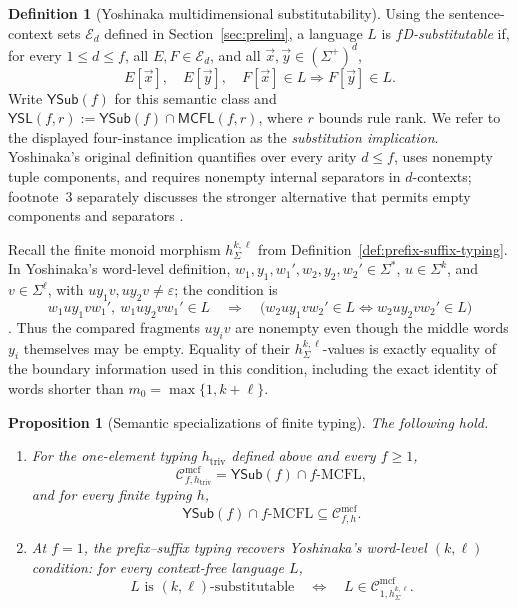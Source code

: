 \documentclass[11pt]{article}
\numberwithin{equation}{section}
\theoremstyle{plain}
\newtheorem{proposition}[theorem]{Proposition}
\theoremstyle{definition}
\newtheorem{definition}[theorem]{Definition}
\theoremstyle{remark}
\newcommand{\Cmcf}[2]{\mathcal{C}^{\mathrm{mcf}}_{#1,#2}}
\newcommand{\tuple}[1]{\vec{#1}}
\newcommand{\eps}{\varepsilon}
\newcommand{\YSub}[1]{\mathsf{YSub}(#1)}
\newcommand{\YSL}[2]{\mathsf{YSL}(#1,#2)}
\begin{document}
\begin{definition}[Yoshinaka multidimensional substitutability]
\label{def:yoshinaka-pd-substitutability}
Using the sentence-context sets $\mathcal E_d$ defined in
Section~\ref{sec:prelim}, a language $L$ is \emph{$f$D-substitutable} if,
for every $1\le d\le f$, all $E,F\in\mathcal E_d$, and all
$\tuple x,\tuple y\in(\Sigma^+)^d$,
\[
 E[\tuple x],\quad E[\tuple y],\quad F[\tuple x]\in L
 \Longrightarrow
 F[\tuple y]\in L.
\]
Write $\YSub{f}$ for this semantic class and
$\YSL{f}{r}:=\YSub{f}\cap\mathsf{MCFL}(f,r)$, where $r$ bounds rule rank.
We refer to the displayed four-instance implication as the
\emph{substitution implication}.
Yoshinaka's original definition quantifies over every arity $d\le f$, uses
nonempty tuple components, and requires nonempty internal separators in
$d$-contexts; footnote~3 separately discusses the stronger alternative that
permits empty components and separators
\cite[Section~3.1 and footnote~3]{Yoshinaka2011}.
\end{definition}

Recall the finite monoid morphism $h_\Sigma^{k,\ell}$ from
Definition~\ref{def:prefix-suffix-typing}.  In Yoshinaka's word-level
definition, $w_1,y_1,w_1',w_2,y_2,w_2'\in\Sigma^*$,
$u\in\Sigma^k$, and $v\in\Sigma^\ell$, with
$uy_1v,uy_2v\ne\eps$; the condition is
\[
 w_1uy_1vw_1',\ w_1uy_2vw_1'\in L
 \quad\Longrightarrow\quad
 \bigl(w_2uy_1vw_2'\in L\iff w_2uy_2vw_2'\in L\bigr)
\]
\cite{Yoshinaka2008}.  Thus the compared fragments $uy_iv$ are nonempty even
though the middle words $y_i$ themselves may be empty.  Equality of their
$h_\Sigma^{k,\ell}$-values is exactly equality of the boundary information
used in this condition, including the exact identity of words shorter than
$m_0=\max\{1,k+\ell\}$.

\begin{proposition}[Semantic specializations of finite typing]
\label{prop:semantic-specializations}
The following hold.
\begin{enumerate}[label=(\roman*),leftmargin=*]
\item For the one-element typing $h_{\mathrm{triv}}$ defined above and every
$f\ge1$,
\[
  \Cmcf{f}{h_{\mathrm{triv}}}=\YSub{f}\cap f\text{-}\mathrm{MCFL},
\]
and for every finite typing $h$,
\[
  \YSub{f}\cap f\text{-}\mathrm{MCFL}\subseteq\Cmcf{f}{h}.
\]
\item At $f=1$, the prefix--suffix typing recovers Yoshinaka's word-level
$(k,\ell)$ condition: for every context-free language $L$,
\[
  L\text{ is $(k,\ell)$-substitutable}
  \quad\Longleftrightarrow\quad
  L\in\Cmcf{1}{h_\Sigma^{k,\ell}}.
\]
\end{enumerate}
\end{proposition}
\end{document}
